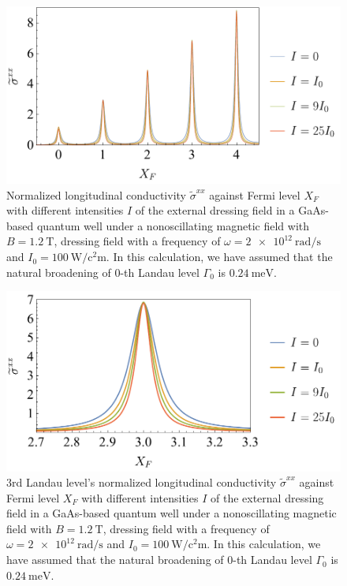 \documentclass[
 reprint,
 amsmath,amssymb,
 aps,
 prb,
]{revtex4-2}
\begin{document}
\begin{figure}[t]
\includegraphics[scale=0.54]{figures/fig_4}
\caption{ Normalized longitudinal conductivity $\widetilde{\sigma}^{xx}$ against Fermi level $X_F$ with different intensities $I$ of the external dressing field in a GaAs-based quantum well under a nonoscillating magnetic field with $B = \SI{1.2}{\tesla}$, dressing field with a  frequency of $\omega =\SI{2e12}{\radian\per\second}$ and $I_0 =\SI{100}{\watt\per\square\centi\metre}$. In this calculation, we have assumed that the natural  broadening of $0$-th Landau level $\Gamma_0$ is $\SI{0.24}{\milli\eV}$.}
\label{fig:5}
\end{figure}

\begin{figure}[t]
\includegraphics[scale=0.54]{figures/fig_5}
\caption{$3$rd Landau level’s normalized longitudinal conductivity $\widetilde{\sigma}^{xx}$ against Fermi level $X_F$ with different intensities $I$ of the external dressing field in a GaAs-based quantum well under a nonoscillating magnetic field with $B = \SI{1.2}{\tesla}$, dressing field with a frequency of $\omega =\SI{2e12}{\radian\per\second}$ and $I_0 =\SI{100}{\watt\per\square\centi\metre}$.
In this calculation, we have assumed that the natural  broadening of $0$-th Landau level $\Gamma_0$ is $\SI{0.24}{\milli\eV}$.}
\label{fig:6}
\end{figure}
\end{document}
